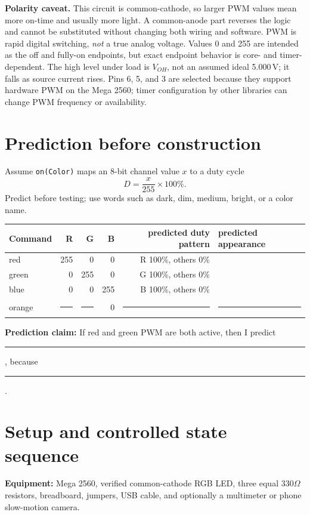 \documentclass[11pt]{article}
\begin{document}
\textbf{Polarity caveat.} This circuit is common-cathode, so larger PWM values mean
more on-time and usually more light. A common-anode part reverses the logic and
cannot be substituted without changing both wiring and software. PWM is rapid
digital switching, \emph{not} a true analog voltage. Values 0 and 255 are intended
as the off and fully-on endpoints, but exact endpoint behavior is core- and
timer-dependent. The high level under load is \(V_{OH}\), not an assumed ideal
5.000\,V; it falls as source current rises. Pins 6, 5, and 3 are selected
because they support hardware PWM on the Mega 2560; timer configuration by other
libraries can change PWM frequency or availability.

\section*{Prediction before construction}
Assume \texttt{on(Color)} maps an 8-bit channel value \(x\) to a duty cycle
\[
       D=\frac{x}{255}\times100\%.
\]
Predict before testing; use words such as dark, dim, medium, bright, or a color name.

\begin{center}
\begin{tabular}{@{}lrrrrp{3.0cm}@{}}
\toprule
Command & R & G & B & predicted duty pattern & predicted appearance\\
\midrule
red    & 255&0&0& R 100\%, others 0\% & \\
green  & 0&255&0& G 100\%, others 0\% & \\
blue   & 0&0&255& B 100\%, others 0\% & \\
orange & \rule{.8cm}{.2pt}&\rule{.8cm}{.2pt}&0&
        \rule{2.8cm}{.2pt}&\rule{2.8cm}{.2pt}\\
\bottomrule
\end{tabular}
\end{center}

\textbf{Prediction claim:} If red and green PWM are both active, then I predict
\rule{3cm}{.2pt}, because \rule{7cm}{.2pt}.

\newpage
\section*{Setup and controlled state sequence}
\textbf{Equipment:} Mega 2560, verified common-cathode RGB LED, three equal
330\(\Omega\) resistors, breadboard, jumpers, USB cable, and optionally a
multimeter or phone slow-motion camera.
\end{document}

